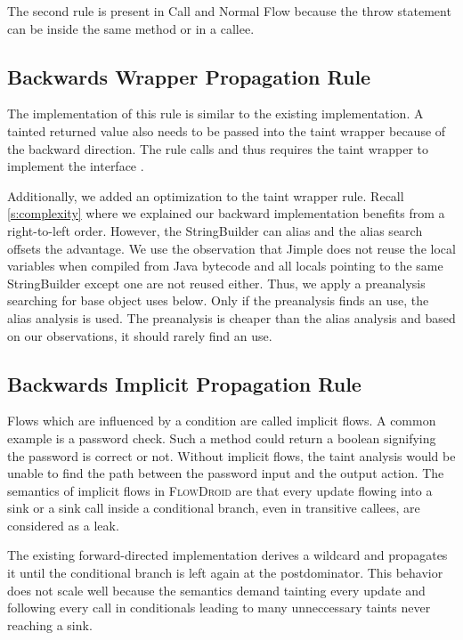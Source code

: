 \documentclass[../draft.tex]{subfiles}
\begin{document}
    The second rule is present in Call and Normal Flow because the throw statement can be inside the same method or in a callee.

    \subsection{Backwards Wrapper Propagation Rule}
    The implementation of this rule is similar to the existing implementation. A tainted returned value also needs to be passed into the taint wrapper because of the backward direction. The rule calls  and thus requires the taint wrapper to implement the  interface .
    
    Additionally, we added an optimization to the taint wrapper rule. Recall \autoref{s:complexity} where we explained our backward implementation benefits from a right-to-left order. However, the StringBuilder can alias and the alias search offsets the advantage. We use the observation that Jimple does not reuse the local variables when compiled from Java bytecode and all locals pointing to the same StringBuilder except one are not reused either. Thus, we apply a preanalysis searching for base object uses below. Only if the preanalysis finds an use, the alias analysis is used. The preanalysis is cheaper than the alias analysis and based on our observations, it should rarely find an use.


    \subsection{Backwards Implicit Propagation Rule}
    Flows which are influenced by a condition are called implicit flows. A common example is a password check. Such a method could return a boolean signifying the password is correct or not. Without implicit flows, the taint analysis would be unable to find the path between the password input and the output action. The semantics of implicit flows in \textsc{FlowDroid} are that every update flowing into a sink or a sink call inside a conditional branch, even in transitive callees, are considered as a leak.
    
    The existing forward-directed implementation derives a wildcard and propagates it until the conditional branch is left again at the postdominator. This behavior does not scale well because the semantics demand tainting every update and following every call in conditionals leading to many unneccessary taints never reaching a sink.
    
\end{document}
